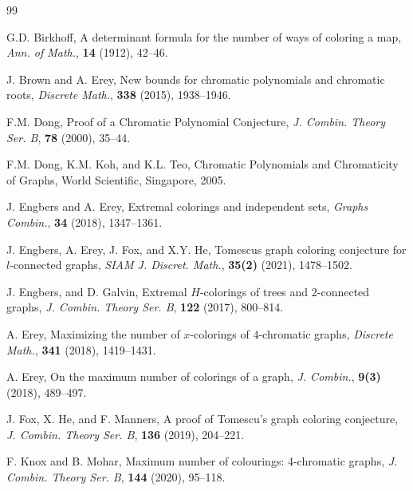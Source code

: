 \documentclass[12pt]{article}
\theoremstyle{definition}
\begin{document}
\begin{thebibliography}{99}
\frenchspacing

 G.D. Birkhoff, A determinant formula for the number of ways of coloring a map, \emph{Ann. of Math.}, {\bf14}
(1912), 42--46.


 J. Brown and A. Erey, New bounds for chromatic polynomials and chromatic roots, \emph{Discrete Math.},
{\bf338} (2015), 1938--1946.



 F.M. Dong, Proof of a Chromatic Polynomial Conjecture, \emph{J. Combin. Theory Ser. B}, {\bf 78} (2000), 35--44.

 F.M. Dong, K.M. Koh, and K.L. Teo, Chromatic Polynomials and Chromaticity of Graphs, World
Scientific, Singapore, 2005.


 J. Engbers and A. Erey, Extremal colorings and independent sets, \emph{Graphs Combin.}, {\bf34} (2018),
1347--1361.

 J. Engbers, A. Erey, J. Fox, and X.Y. He, Tomescus graph coloring conjecture for $l$-connected graphs, \emph{SIAM J. Discret. Math.}, {\bf35(2)} (2021), 1478--1502.


 J. Engbers, and D. Galvin, Extremal $H$-colorings of trees and $2$-connected graphs, \emph{J. Combin. Theory Ser. B}, {\bf 122}
(2017), 800--814.


 A. Erey, Maximizing the number of $x$-colorings of $4$-chromatic graphs, \emph{Discrete Math.}, {\bf 341} (2018), 1419--1431.

 A. Erey, On the maximum number of colorings of a graph, \emph{J. Combin.}, {\bf 9(3)} (2018), 489--497.

 J. Fox, X. He, and F. Manners, A proof of Tomescu's graph coloring conjecture, \emph{J. Combin.
Theory Ser. B}, {\bf 136} (2019), 204--221.

  F. Knox and B. Mohar, Maximum number of colourings: 4-chromatic graphs, \emph{J. Combin. Theory Ser. B}, {\bf 144} (2020), 95--118.


\end{thebibliography}
\end{document}

